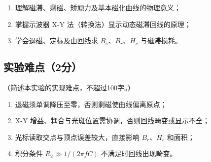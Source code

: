 \documentclass{Preport}
\begin{document}
\begin{enumerate}
    \item 理解磁滞、剩磁、矫顽力及基本磁化曲线的物理意义；
    \item 掌握示波器 X-Y 法（转换法）显示动态磁滞回线的原理；
    \item 学会退磁、定标及由回线求 $B_s$、$B_r$、$H_c$ 与磁滞损耗。
\end{enumerate}

\subsection{实验难点（2分）}
（简述本实验的实现难点，不超过100字。）

\begin{enumerate}
    \item 退磁须单调降压至零，否则剩磁使曲线偏离原点；
    \item X-Y 增益、耦合与光斑位置需协调，否则回线畸变或显示不全；
    \item 光标读取交点与顶点误差较大，直接影响 $B_r$、$H_c$ 和面积；
    \item 积分条件 $R_2\gg 1/(2\pi fC)$ 不满足时回线出现畸变。
\end{enumerate}


\end{document}
